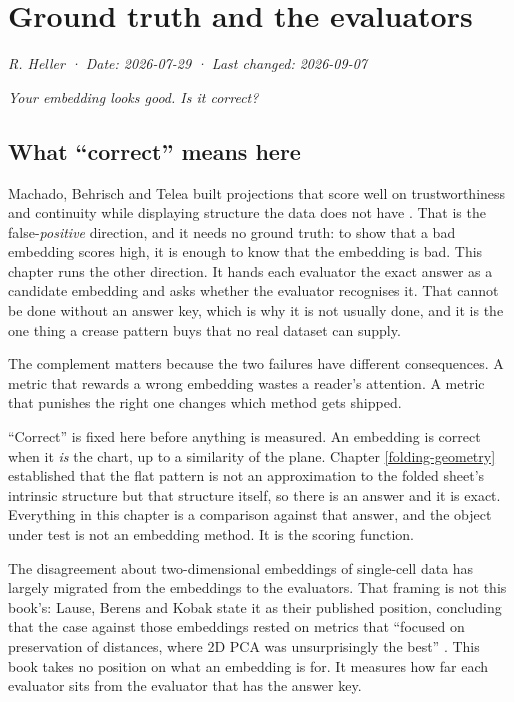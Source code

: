 \documentclass[
  british,
  a4paper,
]{book}
\begin{document}
\chapter{Ground truth and the evaluators}\label{evaluation}

\emph{R. Heller · Date: 2026-07-29 · Last changed: 2026-09-07}

\emph{Your embedding looks good. Is it correct?}

\section{What ``correct'' means here}\label{eval-question}

Machado, Behrisch and Telea built projections that score well on trustworthiness
and continuity while displaying structure the data does not have
\citep{machado2025necessary}. That is the false-\emph{positive} direction, and it needs no
ground truth: to show that a bad embedding scores high, it is enough to know
that the embedding is bad. This chapter runs the other direction. It hands each
evaluator the exact answer as a candidate embedding and asks whether the
evaluator recognises it. That cannot be done without an answer key, which is why
it is not usually done, and it is the one thing a crease pattern buys that no
real dataset can supply.

The complement matters because the two failures have different consequences. A
metric that rewards a wrong embedding wastes a reader's attention. A metric that
punishes the right one changes which method gets shipped.

``Correct'' is fixed here before anything is measured. An embedding is correct
when it \emph{is} the chart, up to a similarity of the plane. Chapter
\ref{folding-geometry} established that the flat pattern is not an approximation
to the folded sheet's intrinsic structure but that structure itself, so there is
an answer and it is exact. Everything in this chapter is a comparison against
that answer, and the object under test is not an embedding method. It is the
scoring function.

The disagreement about two-dimensional embeddings of single-cell data has
largely migrated from the embeddings to the evaluators. That framing is not this
book's: Lause, Berens and Kobak state it as their published position, concluding
that the case against those embeddings \citep{chari2023specious} rested on metrics
that ``focused on preservation of distances, where 2D PCA was unsurprisingly the
best'' \citep{lause2024elephant}. This book takes no position on what an embedding is
for. It measures how far each evaluator sits from the evaluator that has the
answer key.
\end{document}
